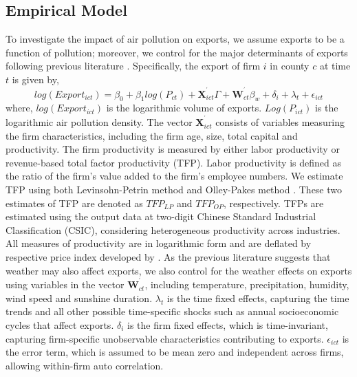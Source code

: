 \documentclass[12pt]{article}
\begin{document}
\subsection{Empirical Model}
To investigate the impact of air pollution on exports, we assume exports to be a function of pollution; moreover, we control for the major determinants of exports following previous literature \citep[e.g.,][]{Kunst1989,Bernard2003}. Specifically, the export of firm $i$ in county $c$ at time $t$ is given by,
\begin{equation}
log(Export_{ict})=\beta _{0}+\beta_{1}log(P_{ct}) +\mathbf{X}_{ict}^{^{\prime }}\Gamma +\mathbf{W}%
_{ct}^{^{\prime }}\beta _{w} +\delta _{i}+\lambda
_{t} +\epsilon _{ict}  \label{equ1}
\end{equation}%
where, $log(Export_{ict})$ is the logarithmic volume of exports. $Log(P_{ict})$ is the logarithmic air pollution density. The vector $\mathbf{X}_{ict}^{^{\prime }}$ consists of variables measuring the firm characteristics, including the firm age, size, total capital and productivity. 
The firm productivity is measured by either labor productivity or revenue-based total
factor productivity (TFP). Labor productivity is defined as the ratio of the firm's value added to the firm's employee numbers. We estimate TFP using both Levinsohn-Petrin method \citep{levinsohn2003estimating} and Olley-Pakes method \citep{olley1996dynamics}. These two estimates of TFP are denoted as $TFP_{LP}$ and $TFP_{OP}$, respectively.
TFPs are estimated using the output data at two-digit Chinese Standard Industrial Classification (CSIC), considering heterogeneous productivity across industries. All measures of productivity are in logarithmic form and are deflated by respective price index developed
by \citep{brandt2017wto}. As the previous literature \citep[e.g.,][]{jones2010climate} suggests that weather may also affect exports, we also control for the weather effects on exports using variables in the vector $\mathbf{W}_{ct}^{^{\prime }}$, including temperature, precipitation, humidity, wind speed and sunshine duration. $\lambda _{t}$ is the time fixed effects, capturing the time trends and all other possible time-specific shocks such as annual
socioeconomic cycles that affect exports. $\delta _{i}$ is the firm fixed effects, which is
time-invariant, capturing firm-specific unobservable characteristics contributing to exports. $%
\epsilon _{ict}$ is the error term, which is assumed to be mean zero and independent across firms, allowing within-firm auto correlation. 
\end{document}
